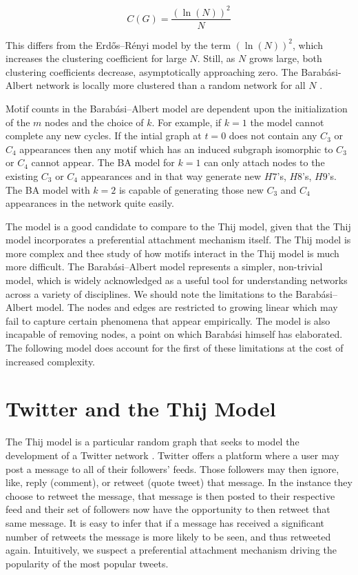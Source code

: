 $$
C(G) = \frac{(\ln (N))^2}{N}
$$

This differs from the Erdős–Rényi model by the term $(\ln (N))^2$,
which increases the clustering coefficient for large $N$. Still, as $N$ grows large,
both clustering coefficients
decrease, asymptotically approaching zero. The Barabási-Albert network is locally
 more clustered than a random network for all $N$ \cite{barabasi2016network}.

Motif counts in the Barabási–Albert model are dependent upon the initialization of the $m$ nodes 
and the choice of $k$. For example, if $k=1$ the model cannot complete any new cycles. If the
intial graph at $t=0$ does not contain any $C_3$ or $C_4$ appearances then any motif 
which has an induced subgraph isomorphic to $C_3$ or $C_4$ cannot appear. The BA model 
for $k=1$ can only attach nodes to the existing  $C_3$ or $C_4$ appearances and in that 
way generate new $H7$'s, $H8$'s, $H9$'s. The BA model with $k=2$ is capable of generating those
 new $C_3$ and $C_4$ appearances in the network quite easily.

The model is a good candidate to compare to the Thij model, given that the Thij model incorporates
a preferential attachment mechanism itself. The Thij model is more complex and thee study of how motifs interact
in the Thij model is much more difficult. The Barabási–Albert model 
represents a simpler, non-trivial model, which is widely acknowledged as a useful tool
for understanding networks across a variety of disciplines. We should note the 
limitations to the Barabási–Albert model. The nodes and edges are restricted to growing linear which
may fail to capture certain phenomena that appear empirically. The model is also incapable
 of removing nodes, a point on which Barabási himself has elaborated. The following model
 does account for the first of these limitations at the cost of increased complexity.

\chapter{Twitter and the Thij Model}
\label{section:Thij model}
The Thij model is a particular random graph that seeks to model the development of a Twitter network 
 \cite{thij}. Twitter offers a platform where a user may post a message
to all of their followers' feeds. Those followers may then ignore, like, reply (comment), or retweet (quote tweet) that message. In the
instance they choose to retweet the message, that message is then posted to their respective feed and their
set of followers now have the opportunity to then retweet that same message. It is easy to infer that if a 
message has received a significant number of retweets the message is more likely to be seen, and thus
retweeted again. Intuitively, we suspect a preferential attachment mechanism driving the popularity of the most popular tweets.

